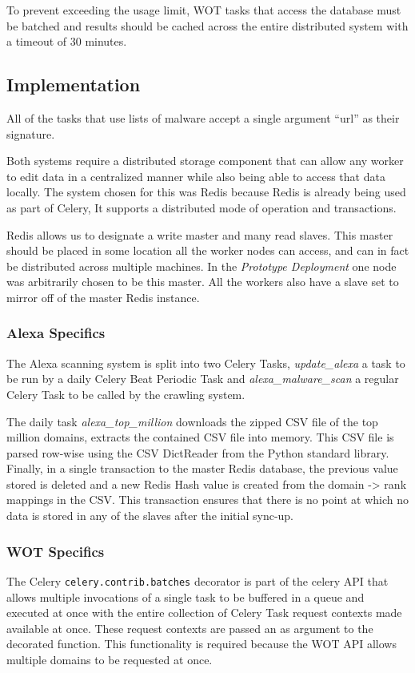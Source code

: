To prevent exceeding the usage limit, WOT tasks that access the database must be batched and results should be cached across the entire distributed system with a timeout of 30 minutes.


\subsection{Implementation}
All of the tasks that use lists of malware accept a single argument ``url'' as their signature.

Both systems require a distributed storage component that can allow any worker to edit data in a centralized manner while also being able to access that data locally. The system chosen for this was Redis\cite{redis} because Redis is already being used as part of Celery, It supports a distributed mode of operation and transactions.

Redis allows us to designate a write master and many read slaves. This master should be placed in some location all the worker nodes can access, and can in fact be distributed across multiple machines.  In the \emph{Prototype Deployment} one node was arbitrarily chosen to be this master. All the workers also have a slave set to mirror off of the master Redis instance.

\subsubsection{Alexa Specifics}
The Alexa scanning system is split into two Celery Tasks, \emph{update_alexa} a task to be run by a daily Celery Beat Periodic Task and \emph{alexa_malware_scan} a regular Celery Task to be called by the crawling system.

The daily task \emph{alexa_top_million} downloads the zipped CSV file of the top million domains, extracts the contained CSV file into memory. This CSV file is parsed row-wise using the CSV DictReader from the Python standard library. Finally, in a single transaction to the master Redis database, the previous value stored is deleted and a new Redis Hash value is created from the domain -> rank mappings in the CSV. This transaction ensures that there is no point at which no data is stored in any of the slaves after the initial sync-up.

\subsubsection{WOT Specifics}
The Celery \verb`celery.contrib.batches` decorator is part of the celery API that allows multiple invocations of a single task to be buffered in a queue and executed at once with the entire collection of Celery Task request contexts made available at once. These request contexts are passed an as argument to the decorated function. This functionality is required because the WOT API allows multiple domains to be requested at once.

